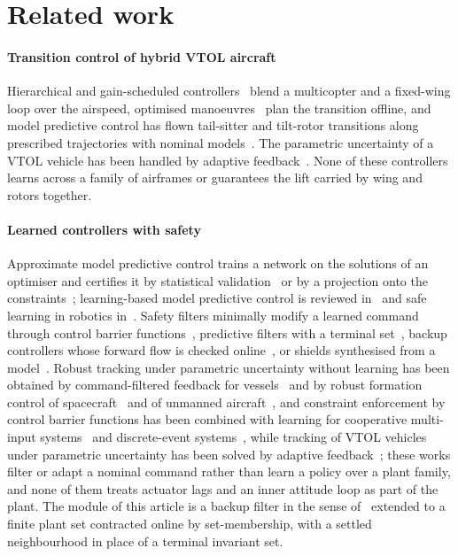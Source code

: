 \section{Related work}\label{sec:related}
\paragraph{Transition control of hybrid VTOL aircraft} Hierarchical and gain-scheduled controllers~\cite{Lyu2017,Verling2016} blend a multicopter and a fixed-wing loop over the airspeed, optimised manoeuvres~\cite{Maqsood2012} plan the transition offline, and model predictive control has flown tail-sitter and tilt-rotor transitions along prescribed trajectories with nominal models~\cite{Li2018,Allenspach2020,Bauersfeld2021}. The parametric uncertainty of a VTOL vehicle has been handled by adaptive feedback~\cite{Dong2020}. None of these controllers learns across a family of airframes or guarantees the lift carried by wing and rotors together.

\paragraph{Learned controllers with safety} Approximate model predictive control trains a network on the solutions of an optimiser and certifies it by statistical validation~\cite{Hertneck2018} or by a projection onto the constraints~\cite{Chen2018,Karg2020}; learning-based model predictive control is reviewed in~\cite{Hewing2020} and safe learning in robotics in~\cite{Brunke2022}. Safety filters minimally modify a learned command through control barrier functions~\cite{Ames2019}, predictive filters with a terminal set~\cite{Wabersich2021}, backup controllers whose forward flow is checked online~\cite{Gurriet2020}, or shields synthesised from a model~\cite{Alshiekh2018}. Robust tracking under parametric uncertainty without learning has been obtained by command-filtered feedback for vessels~\cite{Dony2020acc} and by robust formation control of spacecraft~\cite{Dony2021jae} and of unmanned aircraft~\cite{Dony2021thesis}, and constraint enforcement by control barrier functions has been combined with learning for cooperative multi-input systems~\cite{Dony2025rs} and discrete-event systems~\cite{Dony2025ieom}, while tracking of VTOL vehicles under parametric uncertainty has been solved by adaptive feedback~\cite{Dong2020}; these works filter or adapt a nominal command rather than learn a policy over a plant family, and none of them treats actuator lags and an inner attitude loop as part of the plant. The module of this article is a backup filter in the sense of~\cite{Gurriet2020,Wabersich2021} extended to a finite plant set contracted online by set-membership, with a settled neighbourhood in place of a terminal invariant set.

